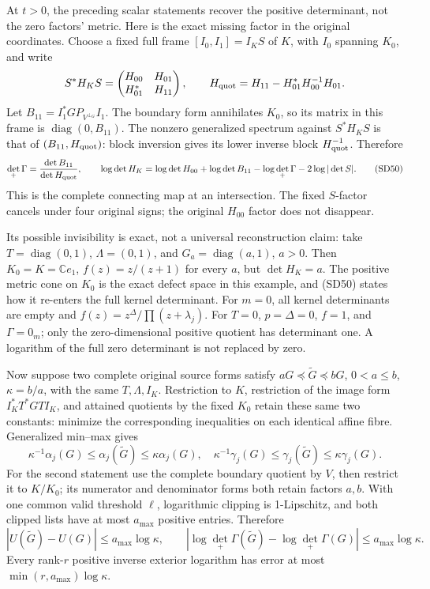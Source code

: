 \documentclass[11pt]{article}
\begin{document}
At \(t>0\), the preceding scalar statements recover the positive determinant, not the zero factors' metric. Here is the exact missing factor in the original coordinates. Choose a fixed full frame \([I_0,I_1]=I_KS\) of \(K\), with \(I_0\) spanning \(K_0\), and write \[
S^*H_KS=\begin{pmatrix}H_{00}&H_{01}\\H_{01}^*&H_{11}\end{pmatrix},
\qquad H_{\rm quot}=H_{11}-H_{01}^*H_{00}^{-1}H_{01}.
\] Let \(B_{11}=I_1^*GP_{V^{\perp_G}}I_1\). The boundary form annihilates \(K_0\), so its matrix in this frame is \(\operatorname{diag}(0,B_{11})\). The nonzero generalized spectrum against \(S^*H_KS\) is that of \((B_{11},H_{\rm quot})\): block inversion gives its lower inverse block \(H_{\rm quot}^{-1}\). Therefore \[
\det_+\Gamma=\frac{\det B_{11}}{\det H_{\rm quot}},\qquad
\log\det H_K
=\log\det H_{00}+\log\det B_{11}
-\log\det_+\Gamma-2\log|\det S|.
\tag{SD50}
\] This is the complete connecting map at an intersection. The fixed \(S\)-factor cancels under four original signs; the original \(H_{00}\) factor does not disappear.

Its possible invisibility is exact, not a universal reconstruction claim: take \(T=\operatorname{diag}(0,1)\), \(\Lambda=(0,1)\), and \(G_a=\operatorname{diag}(a,1)\), \(a>0\). Then \(K_0=K=\mathbb Ce_1\), \(f(z)=z/(z+1)\) for every \(a\), but \(\det H_K=a\). The positive metric cone on \(K_0\) is the exact defect space in this example, and (SD50) states how it re-enters the full kernel determinant. For \(m=0\), all kernel determinants are empty and \(f(z)=z^\Delta/\prod(z+\lambda_j)\). For \(T=0\), \(p=\Delta=0\), \(f=1\), and \(\Gamma=0_m\); only the zero-dimensional positive quotient has determinant one. A logarithm of the full zero determinant is not replaced by zero.

Now suppose two complete original source forms satisfy \(aG\preceq\widetilde G\preceq bG\), \(0<a\le b\), \(\kappa=b/a\), with the same \(T,\Lambda,I_K\). Restriction to \(K\), restriction of the image form \(I_K^*T^*GTI_K\), and attained quotients by the fixed \(K_0\) retain these same two constants: minimize the corresponding inequalities on each identical affine fibre. Generalized min--max gives \[
\kappa^{-1}\alpha_j(G)\le\alpha_j(\widetilde G)\le\kappa\alpha_j(G),
\quad
\kappa^{-1}\gamma_j(G)\le\gamma_j(\widetilde G)\le\kappa\gamma_j(G).
\tag{SD51}
\] For the second statement use the complete boundary quotient by \(V\), then restrict it to \(K/K_0\); its numerator and denominator forms both retain factors \(a,b\). With one common valid threshold \(\ell\), logarithmic clipping is 1-Lipschitz, and both clipped lists have at most \(a_{\max}\) positive entries. Therefore \[
|U(\widetilde G)-U(G)|\le a_{\max}\log\kappa,\qquad
|\log\det_+\Gamma(\widetilde G)-\log\det_+\Gamma(G)|
\le a_{\max}\log\kappa.
\tag{SD52}
\] Every rank-\(r\) positive inverse exterior logarithm has error at most \(\min(r,a_{\max})\log\kappa\).
\end{document}
